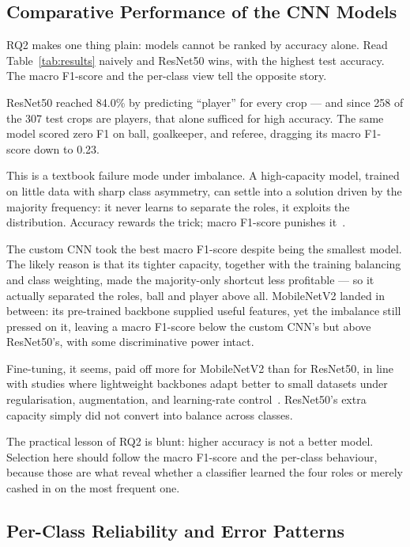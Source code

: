 \documentclass[preprint,12pt]{elsarticle}
\begin{document}
\subsection{Comparative Performance of the CNN Models}

RQ2 makes one thing plain: models cannot be ranked by accuracy alone. Read Table~\ref{tab:results} naively and ResNet50 wins, with the highest test accuracy. The macro F1-score and the per-class view tell the opposite story.

ResNet50 reached 84.0\% by predicting ``player'' for every crop --- and since 258 of the 307 test crops are players, that alone sufficed for high accuracy. The same model scored zero F1 on ball, goalkeeper, and referee, dragging its macro F1-score down to 0.23.

This is a textbook failure mode under imbalance. A high-capacity model, trained on little data with sharp class asymmetry, can settle into a solution driven by the majority frequency: it never learns to separate the roles, it exploits the distribution. Accuracy rewards the trick; macro F1-score punishes it~\cite{ghosh2024imbalance}.

The custom CNN took the best macro F1-score despite being the smallest model. The likely reason is that its tighter capacity, together with the training balancing and class weighting, made the majority-only shortcut less profitable --- so it actually separated the roles, ball and player above all. MobileNetV2 landed in between: its pre-trained backbone supplied useful features, yet the imbalance still pressed on it, leaving a macro F1-score below the custom CNN's but above ResNet50's, with some discriminative power intact.

Fine-tuning, it seems, paid off more for MobileNetV2 than for ResNet50, in line with studies where lightweight backbones adapt better to small datasets under regularisation, augmentation, and learning-rate control~\cite{martins2025mobilenet,sandler2018mobilenetv2}. ResNet50's extra capacity simply did not convert into balance across classes.

The practical lesson of RQ2 is blunt: higher accuracy is not a better model. Selection here should follow the macro F1-score and the per-class behaviour, because those are what reveal whether a classifier learned the four roles or merely cashed in on the most frequent one.

\subsection{Per-Class Reliability and Error Patterns}
\end{document}
